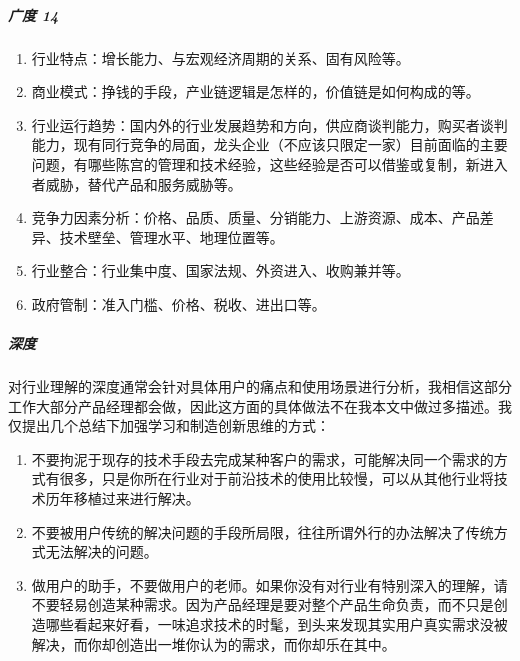 \documentclass[letterpaper,10pt,english]{sphinxmanual}
\begin{document}
\subparagraph{广度 14\sphinxfootnotemark[514]}
\label{\detokenize{chapter_knowledge/industry_analysis:id24}}%
\begin{footnotetext}[514]\sphinxAtStartFootnote
{}
%
\end{footnotetext}\ignorespaces \begin{enumerate}
%
\item {} 
行业特点：增长能力、与宏观经济周期的关系、固有风险等。

\item {} 
商业模式：挣钱的手段，产业链逻辑是怎样的，价值链是如何构成的等。

\item {} 
行业运行趋势：国内外的行业发展趋势和方向，供应商谈判能力，购买者谈判能力，现有同行竞争的局面，龙头企业（不应该只限定一家）目前面临的主要问题，有哪些陈宫的管理和技术经验，这些经验是否可以借鉴或复制，新进入者威胁，替代产品和服务威胁等。

\item {} 
竞争力因素分析：价格、品质、质量、分销能力、上游资源、成本、产品差异、技术壁垒、管理水平、地理位置等。

\item {} 
行业整合：行业集中度、国家法规、外资进入、收购兼并等。

\item {} 
政府管制：准入门槛、价格、税收、进出口等。

\end{enumerate}


\subparagraph{深度}
\label{\detokenize{chapter_knowledge/industry_analysis:id25}}
对行业理解的深度通常会针对具体用户的痛点和使用场景进行分析，我相信这部分工作大部分产品经理都会做，因此这方面的具体做法不在我本文中做过多描述。我仅提出几个总结下加强学习和制造创新思维的方式：
\begin{enumerate}
%
\item {} 
不要拘泥于现存的技术手段去完成某种客户的需求，可能解决同一个需求的方式有很多，只是你所在行业对于前沿技术的使用比较慢，可以从其他行业将技术历年移植过来进行解决。

\item {} 
不要被用户传统的解决问题的手段所局限，往往所谓外行的办法解决了传统方式无法解决的问题。

\item {} 
做用户的助手，不要做用户的老师。如果你没有对行业有特别深入的理解，请不要轻易创造某种需求。因为产品经理是要对整个产品生命负责，而不只是创造哪些看起来好看，一味追求技术的时髦，到头来发现其实用户真实需求没被解决，而你却创造出一堆你认为的需求，而你却乐在其中。

\end{enumerate}
\end{document}
